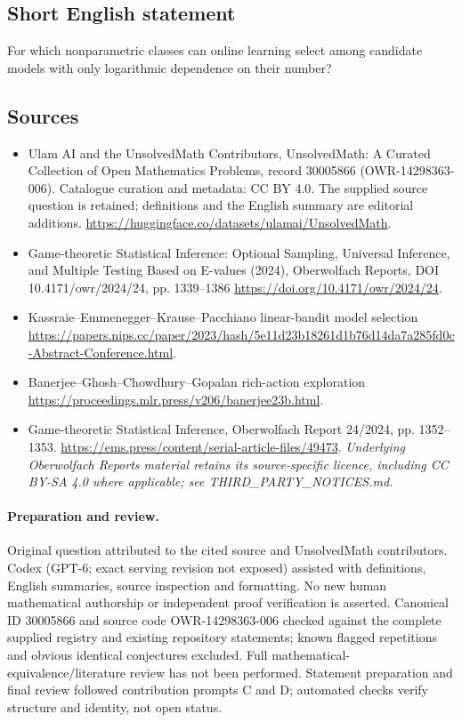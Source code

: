 \documentclass[11pt]{article}
\begin{document}
\subsection{Short English statement}
For which nonparametric classes can online learning select among candidate models with only logarithmic dependence on their number?
\subsection{Sources}
\begin{itemize}
\item[\hypertarget{source:30005866:1}{S1}] Ulam AI and the UnsolvedMath Contributors, UnsolvedMath: A Curated Collection of Open Mathematics Problems, record 30005866 (OWR-14298363-006). Catalogue curation and metadata: CC BY 4.0. The supplied source question is retained; definitions and the English summary are editorial additions.
\url{https://huggingface.co/datasets/ulamai/UnsolvedMath}.
\item[\hypertarget{source:30005866:2}{S2}] Game-theoretic Statistical Inference: Optional Sampling, Universal Inference, and Multiple Testing Based on E-values (2024), Oberwolfach Reports, DOI 10.4171/owr/2024/24, pp. 1339--1386
\url{https://doi.org/10.4171/owr/2024/24}.
\item[\hypertarget{source:30005866:3}{S3}] Kassraie--Emmenegger--Krause--Pacchiano linear-bandit model selection
\url{https://papers.nips.cc/paper/2023/hash/5e11d23b18261d1b76d14da7a285fd0c-Abstract-Conference.html}.
\item[\hypertarget{source:30005866:4}{S4}] Banerjee--Ghosh--Chowdhury--Gopalan rich-action exploration
\url{https://proceedings.mlr.press/v206/banerjee23b.html}.
\item[\hypertarget{source:30005866:5}{S5}] Game-theoretic Statistical Inference, Oberwolfach Report 24/2024, pp. 1352--1353.
\url{https://ems.press/content/serial-article-files/49473}.
\textit{Underlying Oberwolfach Reports material retains its source-specific licence, including CC BY-SA 4.0 where applicable; see THIRD\_PARTY\_NOTICES.md.}
\end{itemize}
\paragraph{Preparation and review.}
Original question attributed to the cited source and UnsolvedMath contributors. Codex (GPT-6; exact serving revision not exposed) assisted with definitions, English summaries, source inspection and formatting. No new human mathematical authorship or independent proof verification is asserted. Canonical ID 30005866 and source code OWR-14298363-006 checked against the complete supplied registry and existing repository statements; known flagged repetitions and obvious identical conjectures excluded. Full mathematical-equivalence/literature review has not been performed. Statement preparation and final review followed contribution prompts C and D; automated checks verify structure and identity, not open status.
\label{end:30005866}
\end{document}
